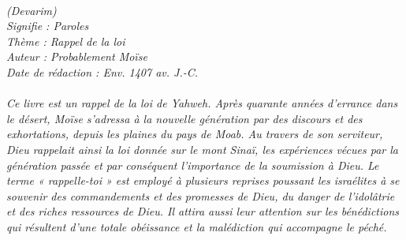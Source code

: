 \BFont
\noindent\hrulefill
{\footnotesize
\textit{
\bigskip
{\centering{}
\\(Devarim)
\\Signifie : Paroles
\\Thème : Rappel de la loi
\\Auteur : Probablement Moïse
\\Date de rédaction : Env. 1407 av. J.-C.\\}
}
\textit{
\\Ce livre est un rappel de la loi de Yahweh. Après quarante années d’errance dans le désert, Moïse s’adressa à la nouvelle génération par des discours et des exhortations, depuis les plaines du pays de Moab. Au travers de son serviteur, Dieu rappelait ainsi la loi donnée sur le mont Sinaï, les expériences vécues par la génération passée et par conséquent l’importance de la soumission à Dieu. Le terme « rappelle-toi » est employé à plusieurs reprises poussant les israélites à se souvenir des commandements et des promesses de Dieu, du danger de l’idolâtrie et des riches ressources de Dieu. Il attira aussi leur attention sur les bénédictions qui résultent d’une totale obéissance et la malédiction qui accompagne le péché.\bigskip
}
}
\par\nobreak\noindent\hrulefill
